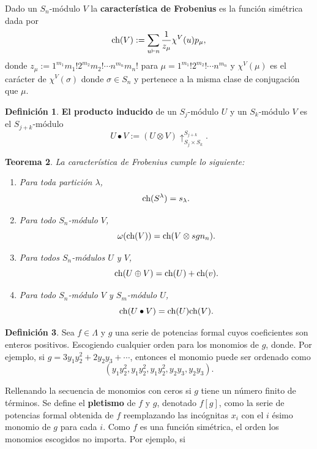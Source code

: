 \documentclass[12pt]{book}
\newtheorem{theorem}{Teorema}[section]
\theoremstyle{definition}
\newtheorem{definition}[theorem]{Definición}
\newcounter{in}
\newcounter{ini}
\begin{document}
Dado un $S_n$-módulo $V$ la \textbf{característica de Frobenius} es la función simétrica dada por
\begin{equation}
  \label{eq:104}
  \textup{ch}(V) := \sum_{u \vdash n}  \frac{1}{z_{\mu}} \chi^{V}(u) p_{\mu},
\end{equation}
donde $z_{\mu} := 1^{m_1} m_{1}! 2^{m_2} m_{2}! \cdots n^{m_n} m_{n}!$
para $\mu = 1^{m_1} ! 2^{m_2}! \cdots n^{m_n}$ y $\chi^{V}(\mu)$ es el
carácter de $\chi^{V}(\sigma)$ donde $\sigma \in S_n$ y pertenece a la
misma clase de conjugación que $\mu$.
\begin{definition}
\label{ind_prod}
\textbf{El producto inducido} de un $S_j$-módulo $U$ y un $S_k$-módulo $V$ es
el $S_{j+k}$-módulo
$$U \bullet V := (U \otimes V) \uparrow^{S_{j+k}}_{S_j \times S_k}.$$
\end{definition}
\begin{theorem}
  \label{ch_f_pr}
  La característica de Frobenius cumple lo siguiente:
  \begin{enumerate}
  \item Para toda partición $\lambda$,
    $$\textup{ch}(S^{\lambda}) = s_{\lambda}.$$
  \item Para todo $S_n$-módulo $V$,
    $$ \omega(\textup{ch}(V)) = \textup{ch}(V \otimes sgn_n).$$
  \item Para todos $S_n$-módulos $U$ y $V$,
    $$\textup{ch}(U \oplus V) = \textup{ch}(U) + \textup{ch}(v).$$
  \item Para todo $S_n$-módulo $V$ y $S_m$-módulo $U$,
    $$\textup{ch}(U \bullet V) = \textup{ch}(U)\textup{ch}(V).$$
  \end{enumerate}
\end{theorem}
\begin{definition}
  \label{s_f_u}
  Sea $f \in \Lambda$ y $g$ una serie de potencias formal cuyos
  coeficientes son enteros positivos. Escogiendo cualquier orden para
  los monomios de $g$, donde. Por ejemplo, si
  $g=3y_{1}y_{2}^{2}+2y_{2}y_{3}+\cdots$, entonces el monomio puede ser
  ordenado como
  $$(y_{1}y_{2}^{2},y_{1}y_{2}^{2},y_{1}y_{2}^{2},y_{2}y_{3},y_{2}y_{3}).$$
\end{definition}
Rellenando la secuencia de monomios con ceros si $g$ tiene un número
finito de términos. Se define el \textbf{pletismo} de $f$ y $g$,
denotado $f \left [ g \right ]$, como la serie de potencias formal
obtenida de $f$ reemplazando las incógnitas $x_{i}$ con el $i$ ésimo
monomio de $g$ para cada $i$. Como $f$ es una función simétrica, el
orden los monomios escogidos no importa. Por ejemplo, si
\end{document}
